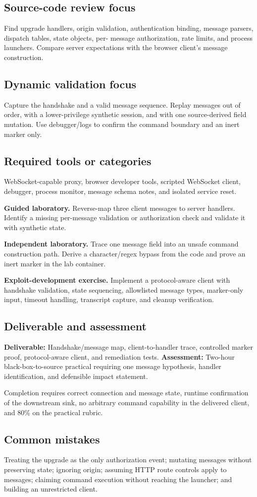 \documentclass[11pt]{article}
\newcommand{\weekfield}[2]{%
  \Needspace{5\baselineskip}
  \subsection*{#1}
  #2
}
\newcommand{\deliverable}[1]{\textbf{Deliverable:} #1}
\newcommand{\assessment}[1]{\textbf{Assessment:} #1}
\begin{document}
\weekfield{Source-code review focus}{Find upgrade handlers, origin validation,
authentication binding, message parsers, dispatch tables, state objects, per-
message authorization, rate limits, and process launchers. Compare server
expectations with the browser client's message construction.}

\weekfield{Dynamic validation focus}{Capture the handshake and a valid message
sequence. Replay messages out of order, with a lower-privilege synthetic session,
and with one source-derived field mutation. Use debugger/logs to confirm the
command boundary and an inert marker only.}

\weekfield{Required tools or categories}{WebSocket-capable proxy, browser
developer tools, scripted WebSocket client, debugger, process monitor, message
schema notes, and isolated service reset.}

\begin{labbox}
\textbf{Guided laboratory.} Reverse-map three client messages to server handlers.
Identify a missing per-message validation or authorization check and validate it
with synthetic state.

\textbf{Independent laboratory.} Trace one message field into an unsafe command
construction path. Derive a character/regex bypass from the code and prove an
inert marker in the lab container.

\textbf{Exploit-development exercise.} Implement a protocol-aware client with
handshake validation, state sequencing, allowlisted message types, marker-only
input, timeout handling, transcript capture, and cleanup verification.
\end{labbox}

\weekfield{Deliverable and assessment}{\deliverable{Handshake/message map,
client-to-handler trace, controlled marker proof, protocol-aware client, and
remediation tests.} \assessment{Two-hour black-box-to-source practical requiring
one message hypothesis, handler identification, and defensible impact statement.}}

\begin{checkpoints}
Completion requires correct connection and message state, runtime confirmation of
the downstream sink, no arbitrary command capability in the delivered client,
and 80\% on the practical rubric.
\end{checkpoints}

\weekfield{Common mistakes}{Treating the upgrade as the only authorization event;
mutating messages without preserving state; ignoring origin; assuming HTTP route
controls apply to messages; claiming command execution without reaching the
launcher; and building an unrestricted client.}
\end{document}
